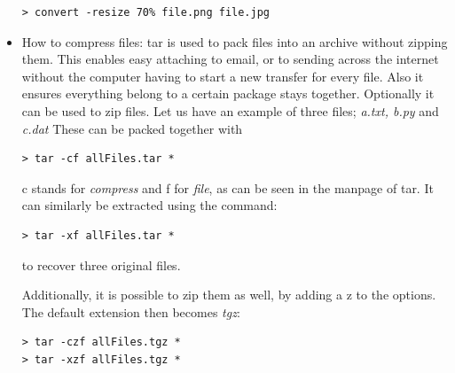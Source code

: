 \begin{itemize}
\begin{mdframed}[backgroundcolor=gray!10]
\begin{verbatim}
> convert -resize 70% file.png file.jpg
\end{verbatim}
\end{mdframed}


\item How to compress files:
tar is used to pack files into an archive without zipping them. 
This enables easy attaching to email, or to sending across the internet without the computer having
to start a new transfer for every file. 
Also it ensures everything belong to a certain package stays together.
Optionally it can be used to zip files.
Let us have an example of three files; {\it a.txt, b.py} and {\it c.dat}
These can be packed together with

\begin{mdframed}[backgroundcolor=gray!10]
\begin{verbatim}
> tar -cf allFiles.tar *
\end{verbatim}
\end{mdframed}

c stands for {\it compress} and f for {\it file}, as can be seen in the manpage of tar.
It can similarly be extracted using the command:

\begin{mdframed}[backgroundcolor=gray!10]
\begin{verbatim}
> tar -xf allFiles.tar *
\end{verbatim}
\end{mdframed}

to recover three original files.

Additionally, it is possible to zip them as well, by adding a z to the options. 
The default extension then becomes {\it tgz}:

\begin{mdframed}[backgroundcolor=gray!10]
\begin{verbatim}
> tar -czf allFiles.tgz *
> tar -xzf allFiles.tgz *
\end{verbatim}
\end{mdframed}



\end{itemize}

